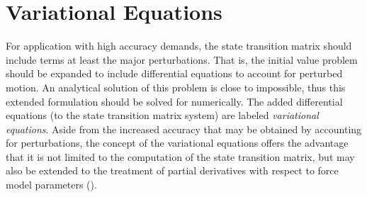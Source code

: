 \section{Variational Equations}\label{sec:pod-variational-equations}

For application with high accuracy demands, the state transition matrix should include 
terms at least the major perturbations. That is, the initial value problem should be 
expanded to include differential equations to account for perturbed motion. An 
analytical solution of this problem is close to impossible, thus this extended  
formulation should be solved for numerically. The added differential equations (to 
the state transition matrix system) are labeled \emph{variational equations}.
Aside from the increased accuracy that may be obtained by accounting for perturbations, the
concept of the variational equations offers the advantage that it is not limited to the
computation of the state transition matrix, but may also be extended to the treatment
of partial derivatives with respect to force model parameters (\cite{Montenbruck2000}).

